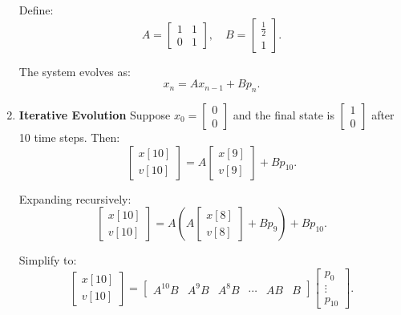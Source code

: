 \begin{example}
\begin{enumerate}
        Define:
        \[
        A = 
        \begin{bmatrix}
        1 & 1 \\ 
        0 & 1
        \end{bmatrix}, \quad 
        B = 
        \begin{bmatrix}
        \frac{1}{2} \\ 
        1
        \end{bmatrix}.
        \]
        
        The system evolves as:
        \[
        x_n = A x_{n-1} + B p_n.
        \]
        
        \item \textbf{Iterative Evolution} Suppose \(x_0 = \begin{bmatrix} 0 \\ 0 \end{bmatrix}\) and the final state is \(\begin{bmatrix} 1\\ 0 \end{bmatrix}\) after 10 time steps. Then:
        \[
        \begin{bmatrix}
        x[10] \\ 
        v[10]
        \end{bmatrix}
        =
        A \begin{bmatrix}
        x[9] \\ 
        v[9]
        \end{bmatrix}
        + B p_{10}.
        \]
        
        Expanding recursively:
        \[
        \begin{bmatrix}
        x[10] \\ 
        v[10]
        \end{bmatrix}
        =
        A \left(A \begin{bmatrix}
        x[8] \\ 
        v[8]
        \end{bmatrix}
        + B p_9 \right) + B p_{10}.
        \]
        
        Simplify to:
        \[
        \begin{bmatrix}
        x[10] \\ 
        v[10]
        \end{bmatrix}
        =
        \begin{bmatrix}
        A^{10} B & A^9 B & A^8 B & \cdots & AB & B
        \end{bmatrix}
        \begin{bmatrix}
        p_0 \\ 
        \vdots \\ 
        p_{10}
        \end{bmatrix}.
        \]
        

\end{enumerate}
\end{example}
